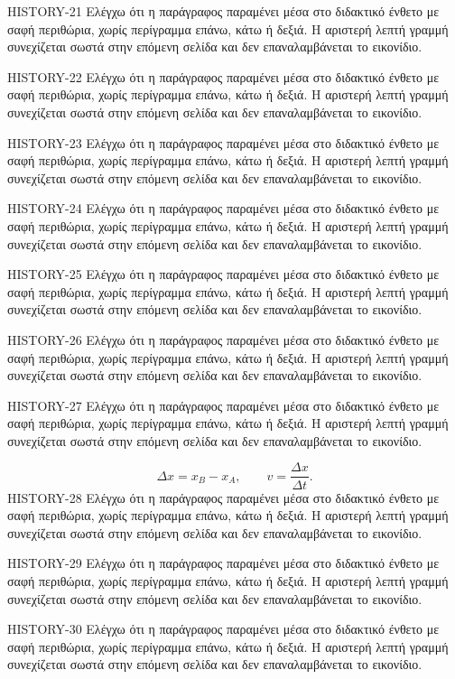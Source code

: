 \begin{HistoryBox}
HISTORY-21 Ελέγχω ότι η παράγραφος παραμένει μέσα στο διδακτικό ένθετο με σαφή περιθώρια, χωρίς περίγραμμα επάνω, κάτω ή δεξιά. Η αριστερή λεπτή γραμμή συνεχίζεται σωστά στην επόμενη σελίδα και δεν επαναλαμβάνεται το εικονίδιο.\par
HISTORY-22 Ελέγχω ότι η παράγραφος παραμένει μέσα στο διδακτικό ένθετο με σαφή περιθώρια, χωρίς περίγραμμα επάνω, κάτω ή δεξιά. Η αριστερή λεπτή γραμμή συνεχίζεται σωστά στην επόμενη σελίδα και δεν επαναλαμβάνεται το εικονίδιο.\par
HISTORY-23 Ελέγχω ότι η παράγραφος παραμένει μέσα στο διδακτικό ένθετο με σαφή περιθώρια, χωρίς περίγραμμα επάνω, κάτω ή δεξιά. Η αριστερή λεπτή γραμμή συνεχίζεται σωστά στην επόμενη σελίδα και δεν επαναλαμβάνεται το εικονίδιο.\par
HISTORY-24 Ελέγχω ότι η παράγραφος παραμένει μέσα στο διδακτικό ένθετο με σαφή περιθώρια, χωρίς περίγραμμα επάνω, κάτω ή δεξιά. Η αριστερή λεπτή γραμμή συνεχίζεται σωστά στην επόμενη σελίδα και δεν επαναλαμβάνεται το εικονίδιο.\par
HISTORY-25 Ελέγχω ότι η παράγραφος παραμένει μέσα στο διδακτικό ένθετο με σαφή περιθώρια, χωρίς περίγραμμα επάνω, κάτω ή δεξιά. Η αριστερή λεπτή γραμμή συνεχίζεται σωστά στην επόμενη σελίδα και δεν επαναλαμβάνεται το εικονίδιο.\par
HISTORY-26 Ελέγχω ότι η παράγραφος παραμένει μέσα στο διδακτικό ένθετο με σαφή περιθώρια, χωρίς περίγραμμα επάνω, κάτω ή δεξιά. Η αριστερή λεπτή γραμμή συνεχίζεται σωστά στην επόμενη σελίδα και δεν επαναλαμβάνεται το εικονίδιο.\par
HISTORY-27 Ελέγχω ότι η παράγραφος παραμένει μέσα στο διδακτικό ένθετο με σαφή περιθώρια, χωρίς περίγραμμα επάνω, κάτω ή δεξιά. Η αριστερή λεπτή γραμμή συνεχίζεται σωστά στην επόμενη σελίδα και δεν επαναλαμβάνεται το εικονίδιο.\par
\[\Delta x=x_B-x_A,\qquad v=\frac{\Delta x}{\Delta t}.\]
HISTORY-28 Ελέγχω ότι η παράγραφος παραμένει μέσα στο διδακτικό ένθετο με σαφή περιθώρια, χωρίς περίγραμμα επάνω, κάτω ή δεξιά. Η αριστερή λεπτή γραμμή συνεχίζεται σωστά στην επόμενη σελίδα και δεν επαναλαμβάνεται το εικονίδιο.\par
HISTORY-29 Ελέγχω ότι η παράγραφος παραμένει μέσα στο διδακτικό ένθετο με σαφή περιθώρια, χωρίς περίγραμμα επάνω, κάτω ή δεξιά. Η αριστερή λεπτή γραμμή συνεχίζεται σωστά στην επόμενη σελίδα και δεν επαναλαμβάνεται το εικονίδιο.\par
HISTORY-30 Ελέγχω ότι η παράγραφος παραμένει μέσα στο διδακτικό ένθετο με σαφή περιθώρια, χωρίς περίγραμμα επάνω, κάτω ή δεξιά. Η αριστερή λεπτή γραμμή συνεχίζεται σωστά στην επόμενη σελίδα και δεν επαναλαμβάνεται το εικονίδιο.\par

\end{HistoryBox}

